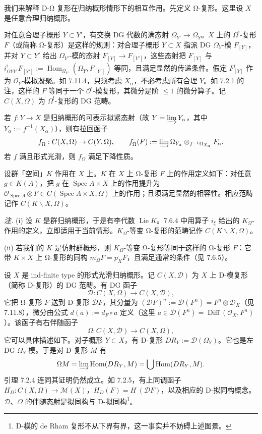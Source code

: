  我们来解释 D-Ω 复形在归纳概形情形下的相互作用。先定义 Ω-复形。这里设 $X$ 是任意合理归纳概形。

对任意合理子概形 $Y\subset Y'$，有交换 DG 代数的满态射 $\Omega_{Y'}\to\Omega_Y$。$X$ 上的 $\Omega^!$-复形 $F$（或简称 Ω-复形）是这样的规则：对合理子概形 $Y\subset X$ 指派 DG $\Omega_Y$-模 $F_{[Y]}$，并对 $Y\subset Y'$ 给出 $\Omega_{Y'}$-模的态射 $F_{[Y]}\to F_{[Y']}$，这些态射把 $F_{[Y]}$ 与 $i^!_{\Omega YY'}F_{[Y']}:=\operatorname{Hom}_{\Omega_{Y'}}(\Omega_Y,F_{[Y']})$ 等同，且满足显然的传递条件。假定 $F^i_{[Y]}$ 作为 $\mathcal{O}_Y$-模拟凝聚。如 7.11.4，只须考虑 $X_\alpha$，不必考虑所有合理 $Y$。如 7.2.1 的注，这样的 $F$ 等同于一个 $\mathcal{O}^!$-模复形，其微分是阶 $\le 1$ 的微分算子。记 $C(X,\Omega)$ 为 $\Omega^!$-复形的 DG 范畴。

若 $f:Y\to X$ 是归纳概形的可表示拟紧态射（故 $Y=\varinjlim Y_\alpha$，其中 $Y_\alpha:=f^{-1}(X_\alpha)$），则有拉回函子
\[
f^\cdot_\Omega:C(X,\Omega)\to C(Y,\Omega),\qquad f^\cdot_\Omega(F):=\varinjlim\Omega_{Y_\alpha}\otimes_{f^{-1}\Omega_{X_\alpha}}F_\alpha.
\]
若 $f$ 满且形式光滑，则 $f^\cdot_\Omega$ 满足下降性质。

设群「空间」$K$ 作用在 $X$ 上。$K$ 在 $X$ 上 Ω-复形 $F$ 上的作用定义如下：对任意 $g\in K(A)$，把 $g$ 在 $\operatorname{Spec}A\times X$ 上的作用提升为 $\mathcal{O}_{\operatorname{Spec}A}\otimes F\in C(\operatorname{Spec}A\times X,\Omega)$ 上的作用；且须满足显然的相容性。相应范畴记作 $C(K\backslash X,\Omega)$。

\emph{注.} (i) 设 $K$ 是群归纳概形，于是有李代数 $\operatorname{Lie}K$。7.6.4 中用算子 $i_\xi$ 给出的 $K_\Omega$-作用的定义，立即适用于当前情形。$K_\Omega$-等变 Ω-复形的范畴记作 $C(K\backslash X,\Omega)$。


(ii) 若我们的 $K$ 是仿射群概形，则 $K_\Omega$-等变 Ω-复形等同于这样的 Ω-复形 $F$：它带 $K\times X$ 上 Ω-复形的同构 $m^\cdot_\Omega F=p^\cdot_X F$，且满足通常的条件（见 7.6.5）。

 设 $X$ 是 ind-finite type 的形式光滑归纳概形。记 $C(X,\mathcal{D})$ 为 $X$ 上 D-模复形（简称 D-复形）的 DG 范畴。有 DG 函子
\begin{equation}\tag{352}
\mathcal{D}:C(X,\Omega)\to C(X,\mathcal{D}),
\end{equation}
它把 Ω-复形 $F$ 送到 D-复形 $\mathcal{D}F$，其分量为 $(\mathcal{D}F)^n:=\mathcal{D}(F^n)=F^n\otimes\mathcal{D}_X$（见 7.11.8），微分由公式 $d(a):=d_F\circ a$ 定义（这里 $a\in\mathcal{D}(F^n)=\operatorname{Diff}(\mathcal{O}_X,F^n)$）。该函子有右伴随函子
\begin{equation}\tag{353}
\Omega:C(X,\mathcal{D})\to C(X,\Omega),
\end{equation}
它可以具体描述如下。对子概形 $Y\subset X$，有 D-复形 $DR_Y:=\mathcal{D}(\Omega_Y)$。它也是左 DG $\Omega_Y$-模。于是对 D-复形 $M$ 有
\[
\Omega M=\varinjlim\operatorname{Hom}(DR_Y,M)=\bigcup\operatorname{Hom}(DR_Y,M).
\]
引理 7.2.4 连同其证明仍然成立。如 7.2.5，有上同调函子 $H^\cdot_D:C(X,\Omega)\to\mathcal{M}(X)$，$H^\cdot_D(F)=H^\cdot(\mathcal{D}F)$，以及相应的 D-拟同构概念。$\mathcal{D}$、$\Omega$ 的伴随态射是拟同构与 D-拟同构\footnote{D-模的 de Rham 复形不从下界有界，这一事实并不妨碍上述图景。}。

